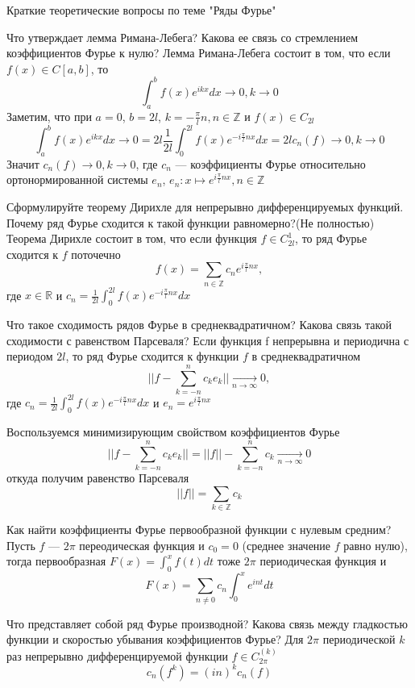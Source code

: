 \documentclass{article}
\begin{document}
\begin{section}{Краткие теоретические вопросы по теме "Ряды Фурье"}
\begin{subsection}{Что утверждает лемма Римана-Лебега? Какова ее связь со стремлением коэффициентов Фурье к нулю?}
Лемма Римана-Лебега состоит в том, что если $f(x)\in C[a,b]$, то
\[\int_a^b f(x)e^{ikx}dx \rightarrow 0, k \rightarrow 0\]
Заметим, что при $a = 0$, $b = 2l$, $k=-\frac{\pi}{l}n, n \in \mathbb{Z}$ и $f(x)\in C_{2l}$ 
\[\int_a^b f(x)e^{ikx}dx \rightarrow 0 = 2l \frac{1}{2l}\int_0^{2l}f(x)e^{-i\frac{\pi}{l}nx}dx = 2lc_n(f) \rightarrow 0, k \rightarrow 0\]
Значит $c_n(f) \rightarrow 0, k \rightarrow 0$, 
где $c_n$ --- коэффициенты Фурье относительно ортонормированной системы ${e_n}$, $e_n: x \mapsto e^{i\frac{\pi}{l}nx}, n \in \mathbb{Z}$
\end{subsection}


\begin{subsection}{Сформулируйте теорему Дирихле для непрерывно дифференцируемых функций. Почему ряд Фурье сходится к такой функции равномерно?(Не полностью)}
Теорема Дирихле состоит в том, что если функция $f \in C_{2l}^1$, то ряд Фурье сходится к $f$ поточечно
\[f(x)=\sum_{n \in \mathbb{Z}} c_n e^{i\frac{\pi}{l}nx}, \]
где $x \in \mathbb{R}$ и $c_n = \frac{1}{2l}\int_0^{2l}f(x)e^{-i\frac{\pi}{l}nx}dx$
\end{subsection}


\begin{subsection}{Что такое сходимость рядов Фурье в среднеквадратичном? Какова связь такой сходимости с равенством Парсеваля?}
Если функция f непрерывна и периодична с периодом $ 2l $, то ряд Фурье сходится к функции $ f $ в среднеквадратичном
\[ ||f-\sum_{k=-n}^{n} c_k e_k|| \underset{n \rightarrow \infty}{\longrightarrow} 0 ,\] 
где $c_n = \frac{1}{2l}\int_0^{2l}f(x)e^{-i\frac{\pi}{l}nx}dx$ и $e_n = e^{i\frac{\pi}{l}nx}$

Воспользуемся минимизирующим свойством коэффициентов Фурье 
\[ ||f-\sum_{k=-n}^{n} c_k e_k|| = 
||f|| - \sum_{k=-n}^{n}c_k \underset{n \rightarrow \infty}{\longrightarrow} 0\]
откуда получим равенство Парсеваля
\[ ||f|| = \sum_{k \in \mathbb{Z}} c_k \]
\end{subsection}


\begin{subsection}{Как найти коэффициенты Фурье первообразной функции с нулевым средним?}
Пусть $ f $ ---  $ 2\pi $ переодическая функция и $ c_0 = 0 $ (среднее значение $f$ равно нулю), тогда первообразная $ F(x) = \int_{0}^{x}f(t)dt $ тоже $ 2\pi $ периодическая функция и 
\[ F(x) = \sum_{n \neq 0}c_n \int_{0}^{x} e^{int}dt \]
\end{subsection}

\begin{subsection}{Что представляет собой ряд Фурье производной? Какова связь между гладкостью функции и скоростью убывания коэффициентов Фурье?}
Для $ 2\pi $ периодической $ k $ раз непрерывно дифференцируемой функции $ f \in C_{2\pi}^{(k)} $
\[ c_n(f^{k}) = (in)^k c_n(f)  \]


\end{subsection}
\end{section}
\end{document}
